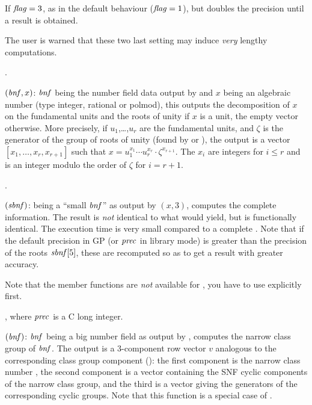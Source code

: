 If $\hbox{\it f\kern0pt lag\/}=3$, as in the default behaviour ($\hbox{\it f\kern0pt lag\/}=1$), but doubles the precision
until a result is obtained.

The user is warned that these two last setting may induce \emph{very} lengthy
computations.

.

$(\hbox{\it bnf\/},x)$: $\hbox{\it bnf\/}$ being the number field data
output by
 and $x$ being an algebraic number (type integer, rational or
polmod), this outputs the decomposition of $x$ on the fundamental units and
the roots of unity if $x$ is a unit, the empty vector otherwise. More
precisely, if $u_1$,\dots,$u_r$ are the fundamental units, and $\zeta$ is
the generator of the group of roots of unity (found by  or
), the output is a vector $[x_1,\dots,x_r,x_{r+1}]$ such that
$x=u_1^{x_1}\cdots u_r^{x_r}\cdot\zeta^{x_{r+1}}$. The $x_i$ are integers for
$i\le r$ and is an integer modulo the order of $\zeta$ for $i=r+1$.

.

$(\hbox{\it sbnf\/})$:  being a ``small $\hbox{\it bnf\/}$''
as output by $(x,3)$, computes the complete 
information. The result is \emph{not} identical to what  would
yield, but is functionally identical. The execution time is very small
compared to a complete . Note that if the default precision in
GP (or $\hbox{\it prec\/}$ in library mode) is greater than the precision of the
roots $\hbox{\it sbnf\/}[5]$, these are recomputed so as to get a result with
greater accuracy.

Note that the member functions are \emph{not} available for , you
have to use  explicitly first.

, where $\hbox{\it prec\/}$ is a
C long integer.

$(\hbox{\it bnf\/})$: $\hbox{\it bnf\/}$ being a big number field as
output by , computes the narrow class group of $\hbox{\it bnf\/}$. The
output is a 3-component row vector $v$ analogous to the corresponding
class group component  (): the
first component is the narrow class number , the second component
is a vector containing the SNF cyclic components
 of the narrow
class group, and the third is a vector giving the generators of the
corresponding  cyclic groups. Note that this function is a
special case of .

